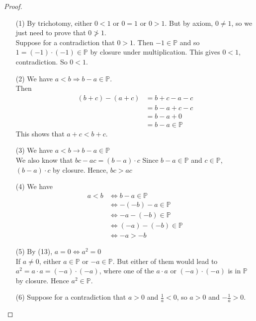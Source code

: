 \documentclass{book}
\begin{document}
\begin{proof}
    \begin{itemize}[itemsep = 0pt]
        \item[(1)] By trichotomy, either $0 < 1$ or $0 = 1$ or $0 > 1$. But by axiom, $0 \neq 1$, so we just need to prove that $0 \ngtr 1$. \\
        Suppose for a contradiction that $0 > 1$. Then $-1 \in \mathbb{P}$ and so $1 = (-1) \cdot (-1) \in \mathbb{P}$ by closure under multiplication. This gives $0 < 1$, contradiction. So $0 < 1$.
        \item[(2)] We have $a < b \Rightarrow b - a \in \mathbb{P}$. \\
        Then
        \begin{align*}
            (b + c) - (a + c) & = b + c - a - c \\
            & = b - a + c - c \\
            & = b - a + 0 \\
            & = b - a \in \mathbb{P}
        \end{align*}
        This shows that $a + c < b + c$.
        \item[(3)] We have $a < b \rightarrow b - a \in \mathbb{P}$ \\
        We also know that $bc - ac = (b - a) \cdot c$
        Since $b - a \in \mathbb{P}$ and $c \in \mathbb{P}$, $(b - a) \cdot c$ by closure. Hence, $bc > ac$
        \item[(4)] We have
        \begin{align*}
            a < b & \iff b - a \in \mathbb{P} \\
            & \iff - (-b) - a \in \mathbb{P} \\
            & \iff - a - (-b) \in \mathbb{P} \\
            & \iff (-a) - (-b) \in \mathbb{P} \\
            & \iff -a > -b
        \end{align*}
        \item[(5)] By (13), $a = 0 \iff a^{2} = 0$ \\
        If $a \neq 0$, either $a \in \mathbb{P}$ or $-a \in \mathbb{P}$. But either of them would lead to $a^{2} = a \cdot a = (-a) \cdot (-a)$, where one of the $a \cdot a$ or $(-a) \cdot (-a)$ is in $\mathbb{P}$ by closure. Hence $a^{2} \in \mathbb{P}$.
        \item[(6)] Suppose for a contradiction that $a > 0$ and $\frac{1}{a} < 0$, so $a > 0$ and $-\frac{1}{a} > 0$. \\

\end{itemize}
\end{proof}
\end{document}

